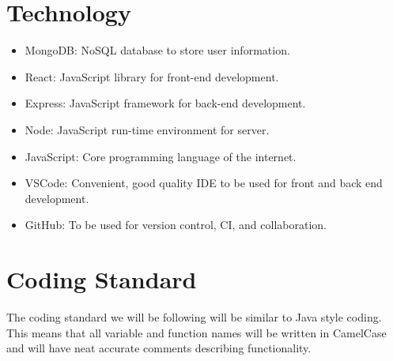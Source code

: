 \documentclass{article}
\begin{document}


\section{Technology}

\begin{itemize}
\item MongoDB: NoSQL database to store user information.
\item React: JavaScript library for front-end development.
\item Express: JavaScript framework for back-end development.
\item Node: JavaScript run-time environment for server.
\item JavaScript: Core programming language of the internet.
\item VSCode: Convenient, good quality IDE to be used for front and back end development.
\item GitHub: To be used for version control, CI, and collaboration.

\end{itemize}

\section{Coding Standard}

The coding standard we will be following will be similar to Java style coding. This means that all variable and function names will be written in CamelCase and will have neat accurate comments describing functionality. 
\end{document}
